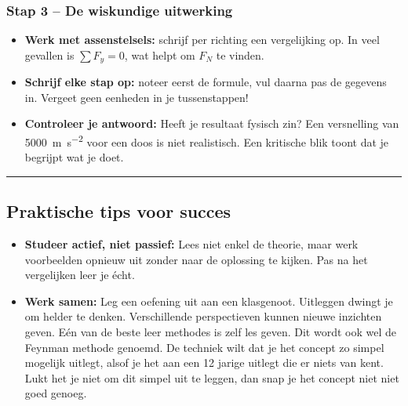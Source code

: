 {\subsubsection*{Stap 3 – De wiskundige uitwerking}
\begin{itemize}
  \item \textbf{Werk met assenstelsels:} schrijf per richting een vergelijking op. In veel gevallen is $\sum F_y = 0$, wat helpt om $F_N$ te vinden.
  \item \textbf{Schrijf elke stap op:} noteer eerst de formule, vul daarna pas de gegevens in. Vergeet geen eenheden in je tussenstappen!
  \item \textbf{Controleer je antwoord:}  
  Heeft je resultaat fysisch zin? Een versnelling van \qty{5000}{\metre\per\second\squared} voor een doos is niet realistisch.  
  Een kritische blik toont dat je begrijpt wat je doet.
\end{itemize}

\begin{center}
\rule{0.6\textwidth}{0.4pt}
\end{center}

 \subsection*{Praktische tips voor succes}
  

\begin{itemize}
  \item \textbf{Studeer actief, niet passief:}  
  Lees niet enkel de theorie, maar werk voorbeelden opnieuw uit zonder naar de oplossing te kijken.  
  Pas na het vergelijken leer je écht.

  \item \textbf{Werk samen:}  
  Leg een oefening uit aan een klasgenoot. Uitleggen dwingt je om helder te denken.  
  Verschillende perspectieven kunnen nieuwe inzichten geven. Eén van de beste leer methodes is zelf les geven. Dit wordt ook wel de Feynman methode genoemd. De techniek wilt dat je het concept zo simpel mogelijk uitlegt, alsof je het aan een 12 jarige uitlegt die er niets van kent. Lukt het je niet om dit simpel uit te leggen, dan snap je het concept niet niet goed genoeg.

  \begin{marginfigure}
	\begin{center}
	\end{center}
	\vspace*{-5mm}
	\caption*{\scriptsize Link naar uitleg over de Feynman techniek}
\end{marginfigure}
 

\end{itemize}}
